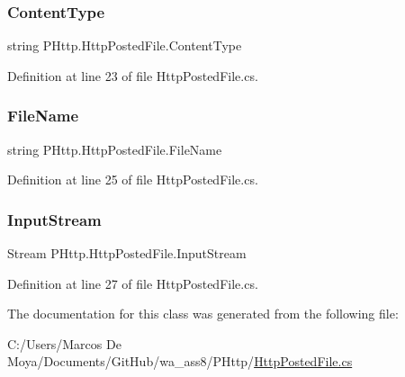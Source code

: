 \mbox{\label{class_p_http_1_1_http_posted_file_acaecc2dc2da7e87ac18aea37c819dd1f}} 
\subsubsection{\texorpdfstring{Content\+Type}{ContentType}}
{\footnotesize\ttfamily string P\+Http.\+Http\+Posted\+File.\+Content\+Type\hspace{0.3cm}{\ttfamily [get]}}



Definition at line 23 of file Http\+Posted\+File.\+cs.

\mbox{\label{class_p_http_1_1_http_posted_file_aabc872b625388d4f29d6ebba84320a56}} 
\subsubsection{\texorpdfstring{File\+Name}{FileName}}
{\footnotesize\ttfamily string P\+Http.\+Http\+Posted\+File.\+File\+Name\hspace{0.3cm}{\ttfamily [get]}}



Definition at line 25 of file Http\+Posted\+File.\+cs.

\mbox{\label{class_p_http_1_1_http_posted_file_aad78b086dfdb2386015369ad7f9ff70e}} 
\subsubsection{\texorpdfstring{Input\+Stream}{InputStream}}
{\footnotesize\ttfamily Stream P\+Http.\+Http\+Posted\+File.\+Input\+Stream\hspace{0.3cm}{\ttfamily [get]}}



Definition at line 27 of file Http\+Posted\+File.\+cs.



The documentation for this class was generated from the following file\+:\begin{DoxyCompactItemize}
\item 
C\+:/\+Users/\+Marcos De Moya/\+Documents/\+Git\+Hub/wa\+\_\+ass8/\+P\+Http/\hyperlink{_http_posted_file_8cs}{Http\+Posted\+File.\+cs}\end{DoxyCompactItemize}
